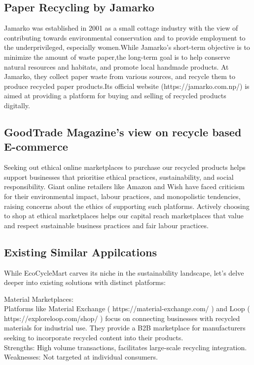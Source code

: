 \documentclass[12pt, a4paper, oneside]{article}
\begin{document}
\subsection{Paper Recycling by Jamarko}
Jamarko was established in 2001 as a small cottage industry with the view of contributing towards environmental conservation and to provide employment to the underprivileged, especially women.While Jamarko’s short-term objective is to minimize the amount of waste paper,the long-term goal is to help conserve natural resources and habitats, and promote local handmade products.
At Jamarko, they collect paper waste from various sources, and recycle them to produce recycled paper products.Its official website (https://jamarko.com.np/) is aimed at providing a platform for buying and selling of recycled products
digitally.

\subsection{GoodTrade Magazine's view on recycle based E-commerce}
Seeking out ethical online marketplaces to purchase our recycled products helps support
businesses that prioritise ethical practices, sustainability, and social responsibility. Giant online
retailers like Amazon and Wish have faced criticism for their environmental impact, labour
practices, and monopolistic tendencies, raising concerns about the ethics of supporting such
platforms. Actively choosing to shop at ethical marketplaces helps our capital reach
marketplaces that value and respect sustainable business practices and fair labour practices. 

\subsection{Existing Similar Appilcations}
While EcoCycleMart carves its niche in the sustainability landscape, let's delve deeper into existing solutions with distinct platforms:

Material Marketplaces: \\
Platforms like Material Exchange ( https://material-exchange.com/ ) and Loop ( https://exploreloop.com/shop/ ) focus on connecting businesses with recycled materials for industrial use. They provide a B2B marketplace for manufacturers seeking to incorporate recycled content into their products.\\
Strengths: High volume transactions, facilitates large-scale recycling integration.\\
Weaknesses: Not targeted at individual consumers.
\end{document}
